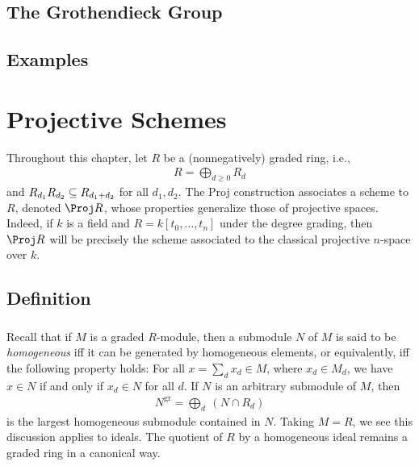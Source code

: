 \documentclass[10pt,final,oneside]{amsbook}
\numberwithin{equation}{section}
\newcommand{\gr}{\mathrm{gr}}
\begin{document}
\section{The Grothendieck Group}

\section{Examples}





\chapter{Projective Schemes}

Throughout this chapter, let $R$ be a (nonnegatively) graded ring, i.e., 
\begin{align}
R = \bigoplus_{d \geq 0} R_d
\end{align}
and $\smash{R_{d_1} R_{d_2}} \subseteq \smash{R_{d_1 + d_2}}$ for all $d_1, d_2$.
The Proj construction associates a scheme to $R$, denoted $\Proj R$, whose properties generalize those of projective spaces.
Indeed, if $k$ is a field and $R = k[t_0, \ldots, t_n]$ under the degree grading, then $\Proj R$ will be precisely the scheme associated to the classical projective $n$-space over $k$.

\section{Definition}

\subsection{}

Recall that if $M$ is a graded $R$-module, then a submodule $N$ of $M$ is said to be \emph{homogeneous} iff it can be generated by homogeneous elements, or equivalently, iff the following property holds:
For all $x  = \sum_d x_d \in M$, where $x_d \in M_d$, we have $x \in N$ if and only if $x_d \in N$ for all $d$.
If $N$ is an arbitrary submodule of $M$, then 
\begin{align}
N^\gr = \bigoplus_d~(N \cap R_d)
\end{align}
is the largest homogeneous submodule contained in $N$.
Taking $M = R$, we see this discussion applies to ideals.
The quotient of $R$ by a homogeneous ideal remains a graded ring in a canonical way.
\end{document}
